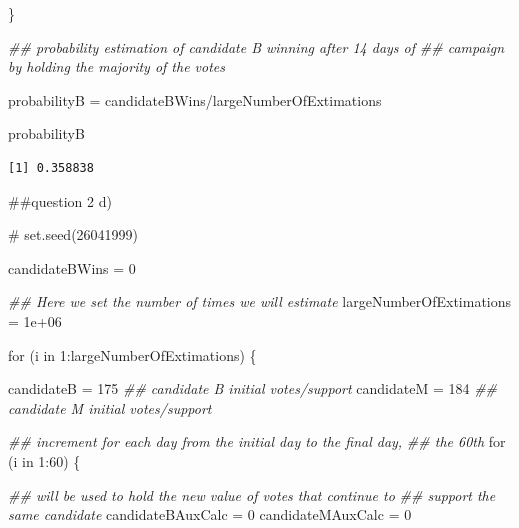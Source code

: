 \documentclass[
  a4paper,
  DIV=11,
  numbers=noendperiod]{scrartcl}
\newenvironment{Shaded}{\begin{snugshade}}{\end{snugshade}}
\newcommand{\CommentTok}[1]{\textcolor[rgb]{0.37,0.37,0.37}{#1}}
\newcommand{\ControlFlowTok}[1]{\textcolor[rgb]{0.00,0.23,0.31}{#1}}
\newcommand{\DecValTok}[1]{\textcolor[rgb]{0.68,0.00,0.00}{#1}}
\newcommand{\DocumentationTok}[1]{\textcolor[rgb]{0.37,0.37,0.37}{\textit{#1}}}
\newcommand{\FloatTok}[1]{\textcolor[rgb]{0.68,0.00,0.00}{#1}}
\newcommand{\NormalTok}[1]{\textcolor[rgb]{0.00,0.23,0.31}{#1}}
\newcommand{\OtherTok}[1]{\textcolor[rgb]{0.00,0.23,0.31}{#1}}
\newcommand{\SpecialCharTok}[1]{\textcolor[rgb]{0.37,0.37,0.37}{#1}}
\begin{document}
\begin{Shaded}
\begin{Highlighting}[]
\NormalTok{\}}

\DocumentationTok{\#\# probability estimation of candidate B winning after 14 days of}
\DocumentationTok{\#\# campaign by holding the majority of the votes}

\NormalTok{probabilityB }\OtherTok{=}\NormalTok{ candidateBWins}\SpecialCharTok{/}\NormalTok{largeNumberOfExtimations}

\NormalTok{probabilityB}
\end{Highlighting}
\end{Shaded}

\begin{verbatim}
[1] 0.358838
\end{verbatim}

\#\#question 2 d)

\begin{Shaded}
\begin{Highlighting}[]
\CommentTok{\# set.seed(26041999)}

\NormalTok{candidateBWins }\OtherTok{=} \DecValTok{0}

\DocumentationTok{\#\# Here we set the number of times we will estimate}
\NormalTok{largeNumberOfExtimations }\OtherTok{=} \FloatTok{1e+06}

\ControlFlowTok{for}\NormalTok{ (i }\ControlFlowTok{in} \DecValTok{1}\SpecialCharTok{:}\NormalTok{largeNumberOfExtimations) \{}

\NormalTok{    candidateB }\OtherTok{=} \DecValTok{175}  \DocumentationTok{\#\# candidate B initial votes/support}
\NormalTok{    candidateM }\OtherTok{=} \DecValTok{184}  \DocumentationTok{\#\# candidate M initial votes/support}

    \DocumentationTok{\#\# increment for each day from the initial day to the final day,}
    \DocumentationTok{\#\# the 60th}
    \ControlFlowTok{for}\NormalTok{ (i }\ControlFlowTok{in} \DecValTok{1}\SpecialCharTok{:}\DecValTok{60}\NormalTok{) \{}

        \DocumentationTok{\#\# will be used to hold the new value of votes that continue to}
        \DocumentationTok{\#\# support the same candidate}
\NormalTok{        candidateBAuxCalc }\OtherTok{=} \DecValTok{0}
\NormalTok{        candidateMAuxCalc }\OtherTok{=} \DecValTok{0}


\end{Highlighting}
\end{Shaded}
\end{document}
